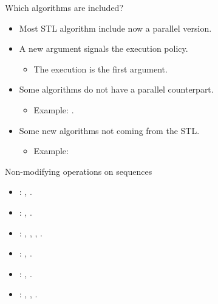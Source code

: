\begin{frame}[t]{Which algorithms are included?}
\begin{itemize}
  \item Most STL algorithm include now a parallel version.

  \vfill
  \item A new argument signals the execution policy.
    \begin{itemize}
      \item The execution is the first argument.
    \end{itemize}

  \vfill\pause
  \item Some algorithms do not have a parallel counterpart.
    \begin{itemize}
      \item Example: .
    \end{itemize}

  \vfill\pause
  \item Some new algorithms not coming from the STL.
    \begin{itemize}
      \item Example: 
    \end{itemize}
\end{itemize}
\end{frame}

\begin{frame}[t]{Non-modifying operations on sequences}
\begin{itemize}
  \item {}: 
    , 
    .

  \vfill
  \item {}: 
    , 
    .

  \vfill
  \item {}: 
    , 
    , 
    ,
    .

  \vfill
  \item {}:
    ,
    .

  \vfill
  \item {}: 
    ,
    .

  \vfill
  \item {}: 
    , 
    ,
    .
\end{itemize}
\end{frame}


